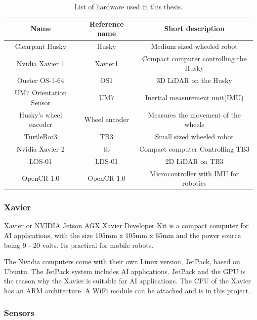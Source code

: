 \begin{table}[H]
    \centering
    \caption{List of hardware used in this thesis.}
    \begin{tabular}{c|c|c}
        Name                    & Reference name    & Short description  \\ \hline
        Clearpant Husky \cite{huskyugv}         & Husky             & Medium sized wheeled robot \\
        Nvidia Xavier 1 \cite{xavierguide}        & Xavier1           & Compact computer controlling the Husky\\
        Ouster OS-1-64 \cite{OS1Datasheet}         & OS1               & 3D LiDAR on the Husky \\
        UM7 Orientation Sensor \cite{um7datasheet} & UM7               & Inertial measurement unit(IMU)  \\
        Husky's wheel encoder   & Wheel encoder     & Measures the movement of the wheels\\
        TurtleBot3 \cite{turtlebot3}          & TB3               & Small sized wheeled robot   \\
        Nvidia Xavier 2         & tb                & Compact computer Controlling TB3  \\
        LDS-01 \cite{lds01}     & LDS-01            & 2D LiDAR on TB3 \\
        OpenCR 1.0 \cite{opencr10}     & OpenCR 1.0        & Microcontroller with IMU for robotics \\
        
    \end{tabular}
    \label{tab:HW_list}
\end{table}

\subsubsection{Xavier}
Xavier or NVIDIA Jetson AGX Xavier Developer Kit is a compact computer for AI applications, with the size 105mm x 105mm x 65mm and the power source being 9 - 20 volts. Its practical for mobile robots. 

The Nividia computers come with their own Linux version, JetPack, based on Ubuntu. The JetPack system includes AI applications. JetPack and the GPU is the reason why the Xavier is suitable for AI applications. The CPU of the Xavier has an ARM architecture. A WiFi module can be attached and is in this project.

\subsubsection{Sensors}

